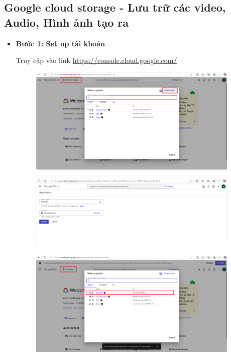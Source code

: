 \subsection{Google cloud storage - Lưu trữ các video, Audio, Hình ảnh tạo ra}
\begin{itemize}[label=]
    \item \textbf{Bước 1: Set up tài khoản} 
    
    Truy cập vào link \url{https://console.cloud.google.com/} \\ 

    \begin{figure}[H]
    \centering
    \includegraphics[width=0.95\textwidth]{images/GGcloud.png}
    
    \end{figure}
    \begin{figure}[H]
    \centering
    \includegraphics[width=0.95\textwidth]{images/GGcloud-1.png}
    
    \end{figure}
    
    \begin{figure}[H]
    \centering
    \includegraphics[width=0.95\textwidth]{images/GGcloud-2.png}
    

\end{figure}
\end{itemize}
